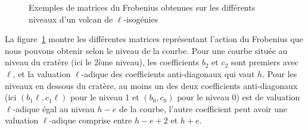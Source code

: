 \documentclass[10pt,a4paper]{book}
\theoremstyle{plain}
\theoremstyle{definition}
\theoremstyle{definition}
\theoremstyle{definition}
\theoremstyle{definition}
\theoremstyle{definition}
\theoremstyle{remark}
\theoremstyle{remark}
\theoremstyle{definition}
\begin{document}
\begin{figure}
\begin{center}
\end{center}
\caption{\label{fig:atk:dif:niv:mat} Exemples de matrices du Frobenius obtenues sur les différents niveaux d'un volcan de $\ell$-isogénies}
\end{figure}
La figure~\ref{fig:atk:dif:niv:mat} montre les différentes matrices
représentant l'action du Frobenius que nous pouvons obtenir selon le niveau de 
la courbe. Pour une courbe située au niveau %
du cratère (ici le $2$ème niveau), les coefficients $b_2$ et $c_2$ sont
premiers avec $\ell$, et la valuation $\ell$-adique des coefficients 
anti-diagonaux qui vaut $h$. Pour les niveaux en dessous du cratère, au 
moins un des deux coefficients anti-diagonaux (ici $(b_1\ell,c_1\ell)$ pour le 
niveau 1 et $(b_0,c_0)$ pour le niveau $0$) est de valuation $\ell$-adique 
égal au niveau $h-e$ de la courbe, l'autre coefficient peut avoir une valuation 
$\ell$-adique comprise entre $h-e+2$ et $h+e$.
\end{document}
